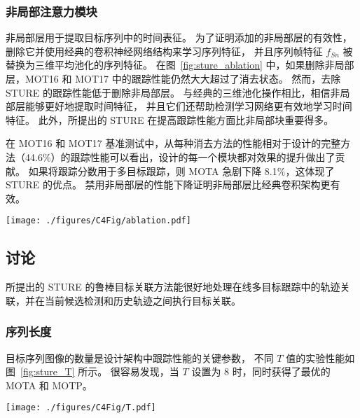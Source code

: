 \subsubsection{非局部注意力模块}
非局部层用于提取目标序列中的时间表征。
为了证明添加的非局部层的有效性，删除它并使用经典的卷积神经网络结构来学习序列特征，
并且序列帧特征 $f_{Sn}$ 被替换为三维平均池化的序列特征。
在图~\ref{fig:sture_ablation} 中，如果删除非局部层，MOT16 和 MOT17 中的跟踪性能仍然大大超过了消去状态。
然而，去除 STURE 的跟踪性能低于删除非局部层。
与经典的三维池化操作相比，相信非局部层能够更好地提取时间特征，
并且它们还帮助检测学习网络更有效地学习时间特征。
此外，所提出的 STURE 在提高跟踪性能方面比非局部块重要得多。

在 MOT16 和 MOT17 基准测试中，从每种消去方法的性能相对于设计的完整方法（44.6$\%$）的跟踪性能可以看出，设计的每一个模块都对效果的提升做出了贡献。
如果将跟踪分数用于多目标跟踪，则 MOTA 急剧下降 8.1$\%$，这体现了 STURE 的优点。
禁用非局部层的性能下降证明非局部层比经典卷积架构更有效。



\vspace{0.5em}
\begin{figure*}[ht]
	\centering
	\texttt{[image: ./figures/C4Fig/ablation.pdf]}
	\vspace{0.2em}
	\caption{基础模块的消去实验}
	\label{fig:sture_ablation}
\end{figure*}




\subsection{讨论}
所提出的 STURE 的鲁棒目标关联方法能很好地处理在线多目标跟踪中的轨迹关联，并在当前候选检测和历史轨迹之间执行目标关联。

\subsubsection{序列长度}
目标序列图像的数量是设计架构中跟踪性能的关键参数，
不同 $T$ 值的实验性能如图~\ref{fig:sture_T} 所示。
很容易发现，当 $T$ 设置为 $8$ 时，同时获得了最优的 MOTA 和 MOTP。

\vspace{0.5em}
\begin{figure*}[ht]
	\centering
	\texttt{[image: ./figures/C4Fig/T.pdf]}
	\vspace{0.2em}
	\caption{在 MOT16 数据集上使用不同序列长度 $T$ 的效果}
	\label{fig:sture_T}
\end{figure*}


